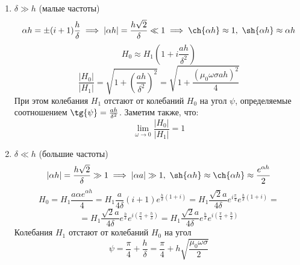 \documentclass[15pt,a5paper,reqno]{article}
\begin{document}
    \begin{enumerate}
        \item $\delta \gg h$ (малые частоты)
            \begin{equation*}
                \alpha h = \pm(i + 1)\frac{h}{\delta} \implies |\alpha h| = \frac{h\sqrt{2}}{\delta} \ll 1 \implies \ch{\alpha h} \approx 1,\\\ \sh{\alpha h} \approx \alpha h
            \end{equation*}
            \begin{equation*}
                H_0 \approx H_1\left(1 + i\frac{ah}{\delta^2}\right)
            \end{equation*}
            \begin{equation}
                \frac{|H_0|}{|H_1|} = \sqrt{1 + \left(\frac{ah}{\delta^2}\right)^2} = \sqrt{1 + \frac{(\mu_0\omega\sigma ah)^2}{4}}
            \end{equation}
            При этом колебания $H_1$ отстают от колебаний $H_0$ на угол $\psi$, определяемые соотношением $\tg{\psi} = \frac{ah}{\delta^2}$.
            Заметим также, что:
            \begin{equation}\label{limit}
                \lim\limits_{\omega \rightarrow 0} \frac{|H_0|}{|H_1|} = 1
            \end{equation}
        \item $\delta \ll h$ (большие частоты)
            \begin{equation*}
                |\alpha h| = \frac{h\sqrt{2}}{\delta} \gg 1 \implies |\alpha a| \gg 1,\\\ \sh{\alpha h} \approx \ch{\alpha h} \approx \frac{e^{\alpha h}}{2}
            \end{equation*}
            \begin{equation*}
                H_0 = H_1\frac{a\alpha e^{\alpha h}}{4} = H_1\frac{a}{4\delta}(i + 1)e^{\frac{h}{\delta}(1 + i)} = H_1\frac{\sqrt{2}a}{4\delta}e^{i\frac{\pi}{4}}e^{\frac{h}{\delta}(1 + i)} = 
            \end{equation*}
            \begin{equation*}
                = H_1\frac{\sqrt{2}a}{4\delta}e^{\frac{h}{\delta}}e^{i\left(\frac{\pi}{4} + \frac{h}{\delta}\right)} = H_1\frac{\sqrt{2}a}{4\delta}e^{\frac{h}{\delta}}e^{i\left(\frac{\pi}{4} + \frac{h}{\delta}\right)}
            \end{equation*}
            Колебания $H_1$ отстают от колебаний $H_0$ на угол
            \begin{equation}\label{phase_shift}
                \psi = \frac{\pi}{4} + \frac{h}{\delta} = \frac{\pi}{4} + h\sqrt{\frac{\mu_0\omega\sigma}{2}}
            \end{equation}
    \end{enumerate}
        
\end{document}
